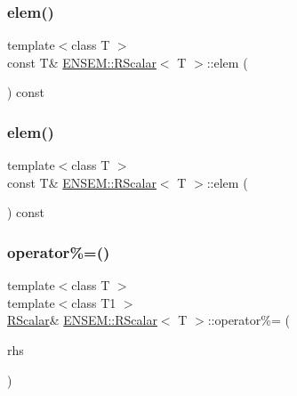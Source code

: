 \mbox{\label{classENSEM_1_1RScalar_a26bfcd896407f15877920b5f737119fe}} 
\subsubsection{\texorpdfstring{elem()}{elem()}\hspace{0.1cm}{\footnotesize\ttfamily [5/6]}}
{\footnotesize\ttfamily template$<$class T $>$ \\
const T\& \mbox{\hyperlink{classENSEM_1_1RScalar}{E\+N\+S\+E\+M\+::\+R\+Scalar}}$<$ T $>$\+::elem (\begin{DoxyParamCaption}{ }\end{DoxyParamCaption}) const\hspace{0.3cm}{\ttfamily [inline]}}

\mbox{\label{classENSEM_1_1RScalar_a26bfcd896407f15877920b5f737119fe}} 
\subsubsection{\texorpdfstring{elem()}{elem()}\hspace{0.1cm}{\footnotesize\ttfamily [6/6]}}
{\footnotesize\ttfamily template$<$class T $>$ \\
const T\& \mbox{\hyperlink{classENSEM_1_1RScalar}{E\+N\+S\+E\+M\+::\+R\+Scalar}}$<$ T $>$\+::elem (\begin{DoxyParamCaption}{ }\end{DoxyParamCaption}) const\hspace{0.3cm}{\ttfamily [inline]}}

\mbox{\label{classENSEM_1_1RScalar_ac5ab25042d679a621ccb42d13fb3b441}} 
\subsubsection{\texorpdfstring{operator\%=()}{operator\%=()}\hspace{0.1cm}{\footnotesize\ttfamily [1/3]}}
{\footnotesize\ttfamily template$<$class T $>$ \\
template$<$class T1 $>$ \\
\mbox{\hyperlink{classENSEM_1_1RScalar}{R\+Scalar}}\& \mbox{\hyperlink{classENSEM_1_1RScalar}{E\+N\+S\+E\+M\+::\+R\+Scalar}}$<$ T $>$\+::operator\%= (\begin{DoxyParamCaption}\item[{const \mbox{\hyperlink{classENSEM_1_1RScalar}{R\+Scalar}}$<$ T1 $>$ \&}]{rhs }\end{DoxyParamCaption})\hspace{0.3cm}{\ttfamily [inline]}}



